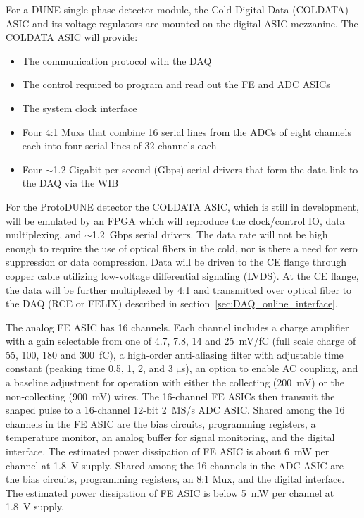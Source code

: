 For a DUNE single-phase detector module, the Cold Digital Data (COLDATA) ASIC and its voltage regulators are mounted on the digital ASIC mezzanine.
The COLDATA ASIC will provide:
\begin{itemize}
\item The communication protocol with the DAQ
\item The control required to program and read out the FE and ADC ASICs
\item The system clock interface
\item Four 4:1 Muxs that combine 16 serial lines from the ADCs of eight 
channels each into four serial lines of 32 channels each
\item Four $\sim$1.2 Gigabit-per-second (Gbps) serial drivers that form the data link to the DAQ via the WIB
\end{itemize}
For the ProtoDUNE detector the COLDATA ASIC, which is still in development, will be 
emulated by an FPGA which will reproduce the clock/control IO, data multiplexing,
and $\sim$1.2~Gbps serial drivers.
The data rate will not be high enough to require the use of optical fibers in the cold,
nor is there a need for zero suppression or data compression.
%
Data will be driven to the CE flange through copper cable utilizing low-voltage differential signaling (LVDS).
At the CE flange, the data will be further multiplexed by 4:1 and transmitted over optical
fiber to the DAQ (RCE or FELIX) described in section~\ref{sec:DAQ_online_interface}.

The analog FE ASIC has 16 channels.
Each channel includes a charge amplifier with a gain selectable from one of 4.7, 7.8, 14 and 25~mV/fC
(full scale charge of 55, 100, 180 and 300~fC),
a high-order anti-aliasing filter with adjustable time
constant (peaking time 0.5, 1, 2, and 3 $\mathrm{\mu}$s),
an option to enable AC coupling,
and a baseline adjustment for operation with either the collecting (200~mV) or the non-collecting (900~mV) wires.
The 16-channel FE ASICs then transmit the shaped pulse to a 16-channel 12-bit 2~MS/s ADC ASIC.
Shared among the 16 channels in the FE ASIC are the bias circuits, programming registers,
a temperature monitor, an analog buffer for signal monitoring, and the digital interface.
The estimated power dissipation of FE ASIC is about 6~mW per channel at 1.8~V supply.
Shared among the 16 channels in the ADC ASIC are the bias circuits, programming registers,
an 8:1 Mux, and the digital interface.
The estimated power dissipation of FE ASIC is below 5~mW per channel at 1.8~V supply.



